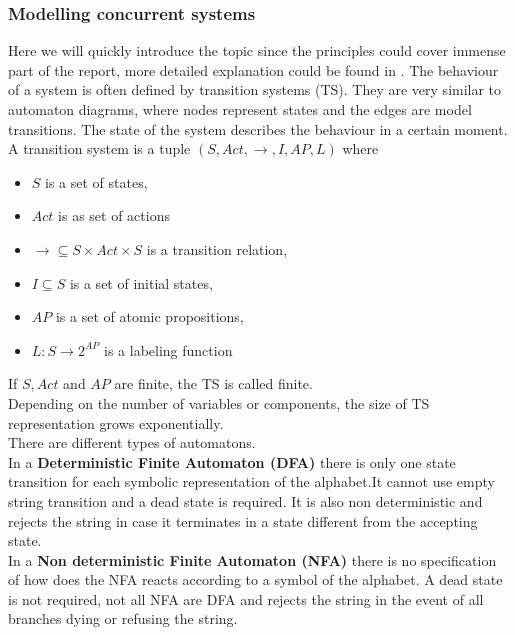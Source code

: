 \documentclass[a4paper, twocolumn]{article}
\begin{document}
\subsubsection{Modelling concurrent systems}
Here we will quickly introduce the topic since the principles could cover immense part of the report, more detailed explanation could be found in \cite{book}.
The behaviour of a system is often defined by transition systems (TS). They are very similar to automaton diagrams, where nodes represent states and the edges are model transitions. The state of the system describes the behaviour in a  certain moment.\\
A transition system is a tuple $(S, Act, \rightarrow , I,AP,L)$ where
\begin{itemize}
    \item $S$ is a set of states,
    \item $Act$ is as set of actions
    \item $\longrightarrow \subseteq S \times Act \times S$ is a transition relation,
    \item $I \subseteq S$ is a set of initial states,
    \item $AP$ is a set of atomic propositions,
    \item $L : S \rightarrow 2^{AP}$ is a labeling function
\end{itemize}
If $S, Act$ and $AP$ are finite, the TS is called finite.\\
Depending on the number of variables or components, the size of TS representation grows exponentially.\\

\noindent There are different types of automatons.\\
In a \textbf{Deterministic Finite Automaton (DFA)} there is only one state transition for each symbolic representation of the alphabet.It cannot use empty string transition and a dead state is required. It is also non deterministic and rejects the string in case it terminates in a state different from the accepting state.\\
In a \textbf{Non deterministic Finite Automaton (NFA)} there is no specification of how does the NFA reacts according to a symbol of the alphabet. A dead state is not required, not all NFA are DFA and rejects the string in the event of all branches dying or refusing the string.
\end{document}

